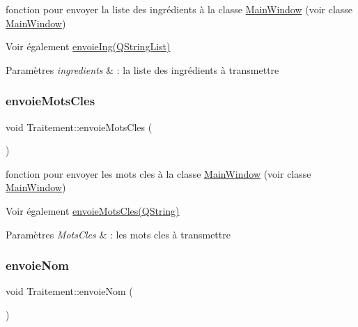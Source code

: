 fonction pour envoyer la liste des ingrédients à la classe \hyperlink{classMainWindow}{Main\+Window} (voir classe \hyperlink{classMainWindow}{Main\+Window}) 

\begin{DoxySeeAlso}{Voir également}
\hyperlink{classTraitement_a8db23635eb895875b0f60acece723df4}{envoie\+Ing(\+Q\+String\+List)} 
\end{DoxySeeAlso}

\begin{DoxyParams}{Paramètres}
{\em ingredients} & \+: la liste des ingrédients à transmettre \\
\hline
\end{DoxyParams}
\mbox{\label{classTraitement_a4df691c4f46371e6c2b6b4c4df102819}} 
\subsubsection{\texorpdfstring{envoie\+Mots\+Cles}{envoieMotsCles}}
{\footnotesize\ttfamily void Traitement\+::envoie\+Mots\+Cles (\begin{DoxyParamCaption}\item[{Q\+String}]{ }\end{DoxyParamCaption})\hspace{0.3cm}{\ttfamily [signal]}}



fonction pour envoyer les mots cles à la classe \hyperlink{classMainWindow}{Main\+Window} (voir classe \hyperlink{classMainWindow}{Main\+Window}) 

\begin{DoxySeeAlso}{Voir également}
\hyperlink{classTraitement_a4df691c4f46371e6c2b6b4c4df102819}{envoie\+Mots\+Cles(\+Q\+String)} 
\end{DoxySeeAlso}

\begin{DoxyParams}{Paramètres}
{\em Mots\+Cles} & \+: les mots cles à transmettre \\
\hline
\end{DoxyParams}
\mbox{\label{classTraitement_ab958dbb923cb1b905c260c4f54907169}} 
\subsubsection{\texorpdfstring{envoie\+Nom}{envoieNom}}
{\footnotesize\ttfamily void Traitement\+::envoie\+Nom (\begin{DoxyParamCaption}\item[{Q\+String}]{ }\end{DoxyParamCaption})\hspace{0.3cm}{\ttfamily [signal]}}



